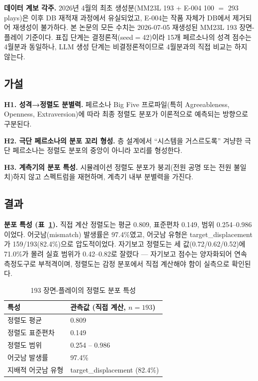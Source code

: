 \documentclass[11pt, a4paper]{article}
\begin{document}
\noindent\textbf{데이터 계보 각주.} 2026년 4월의 최초 생성분(MM23L 193 + E-004 100 $=$ 293 plays)은 이후 DB 재적재 과정에서 유실되었고, E-004는 작품 자체가 DB에서 제거되어 재생성이 불가하다. 본 논문의 모든 수치는 2026-07-05 재생성된 MM23L 193 장면-플레이 기준이다. 표집 단계는 결정론적(seed$=$42)이라 15개 페르소나의 성격 점수는 4월분과 동일하나, LLM 생성 단계는 비결정론적이므로 4월분과의 직접 비교는 하지 않는다.

\subsection{가설}
\textbf{H1. 성격→정렬도 분별력.} 페르소나 Big Five 프로파일(특히 Agreeableness, Openness, Extraversion)에 따라 최종 정렬도 분포가 이론적으로 예측되는 방향으로 구분된다.

\textbf{H2. 극단 페르소나의 분포 꼬리 형성.} 층 설계에서 ``시스템을 거스르도록'' 겨냥한 극단 페르소나는 정렬도 분포의 중앙이 아니라 꼬리를 형성한다.

\textbf{H3. 계측기의 분포 특성.} 시뮬레이션 정렬도 분포가 붕괴(전원 공명 또는 전원 불일치)하지 않고 스펙트럼을 재현하며, 계측기 내부 분별력을 가진다.

\subsection{결과}

\textbf{분포 특성 (표~\ref{tab:dist}).} 직접 계산 정렬도는 평균 0.809, 표준편차 0.149, 범위 0.254--0.986이었다. 어긋남(mismatch) 발생률은 97.4\%였고, 어긋남 유형은 target\_displacement가 159/193(82.4\%)으로 압도적이었다. 자기보고 정렬도는 세 값(0.72/0.62/0.52)에 71.0\%가 몰려 실효 범위가 0.42--0.82로 잘렸다 --- 자기보고 점수는 양자화되어 연속 측정도구로 부적격이며, 정렬도는 감정 분포에서 직접 계산해야 함이 실측으로 확인된다.

\begin{table}[H]
\centering
\caption{193 장면-플레이의 정렬도 분포 특성}
\label{tab:dist}
\begin{tabular}{l l}
\toprule
\textbf{특성} & \textbf{관측값 (직접 계산, $n=193$)} \\
\midrule
정렬도 평균 & 0.809 \\
정렬도 표준편차 & 0.149 \\
정렬도 범위 & 0.254 -- 0.986 \\
어긋남 발생률 & 97.4\% \\
지배적 어긋남 유형 & target\_displacement (82.4\%) \\
\bottomrule
\end{tabular}
\end{table}
\end{document}
